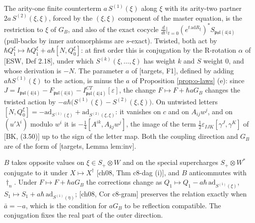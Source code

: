 \begin{remark}
\label{rem:o-alpha}
The arity-one finite counterterm $a\,S^{(1)}(\xi)$ along $\xi$ with its arity-two partner $2a\,S^{(2)}(\xi,\xi)$, forced by the $(\xi,\xi)$ component of the master equation, is the restriction to $\xi$ of $G_B$, and also of the exact cocycle $\frac{d}{dt}|_{t=0}(e^{t\,\mathrm{ad}R_\xi})^*S_{\mathfrak{psl}(4|4)}$ (pull-backs by inner automorphisms are $s$-exact). Twisted, both act by $\hbar Q^\xi_1\mapsto\hbar Q^\xi_1+a\hbar[N,Q^\xi_0]$: at first order this is conjugation by the R-rotation $\alpha$ of [ESW, Def 2.18], under which $S^{(k)}(\xi,\dots,\xi)$ has weight $k$ and $S$ weight $0$, and whose derivation is $-N$. The parameter $a$ of [targets, F1], defined by adding $a\hbar S^{(1)}(\xi)$ to the action, is minus the $a$ of Proposition \ref{prop:o-laws} (e): since $J=I_{\mathfrak{psl}(4|4)}-F_{\mathfrak{psl}(4|4)}-I^{CT}_{\mathfrak{psl}(4|4)}[\varepsilon]$, the change $F\mapsto F+\hbar aG_B$ changes the twisted action by $-a\hbar\big(S^{(1)}(\xi)-S^{(2)}(\xi,\xi)\big)$. On untwisted letters $[N,Q^\xi_0]=-\mathrm{ad}_{S^{(1)}(\xi)}+\mathrm{ad}_{S^{(2)}(\xi,\xi)}$: it vanishes on $c$ and on $A_{ij}w^j$, and on $(u'\lambda^i)$ modulo $w^i$ it is $-\tfrac14[A^{ik},A_{kj}w^j]$, the image of the term $\tfrac12\varepsilon_{IJK}[\gamma^J,\gamma^K]$ of [BK, (3.50)] up to the sign of the letter map. Both the coupling direction and $G_B$ are of the form of [targets, Lemma lem:inv].
\end{remark}

\begin{remark}
\label{rem:o-GBdagger}
$B$ takes opposite values on $\xi\in S_+\otimes W$ and on the special supercharges $S_+\otimes W^*$ conjugate to it under $X\mapsto X^\dagger$ [ch08, Thm c8-dag (i)], and $B$ anticommutes with $\dagger_n$. Under $F\mapsto F+\hbar aG_B$ the corrections change as $Q_1\mapsto Q_1-a\hbar\,\mathrm{ad}_{S^{(1)}(\xi)}$, $S_1\mapsto S_1+a\hbar\,\mathrm{ad}_{S^{(1)}(\eta)}$; [ch08, Cor c8-gram] preserves the relation exactly when $\bar a=-a$, which is the condition for $aG_B$ to be reflection compatible. The conjugation fixes the real part of the outer direction.
\end{remark}


